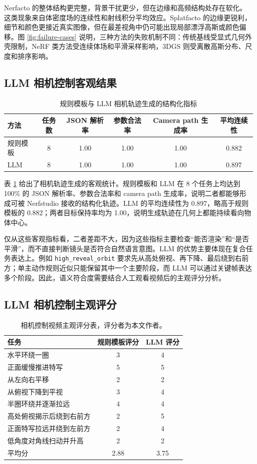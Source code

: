 \documentclass[a4paper, 12pt, centering]{article}
\begin{document}
Nerfacto 的整体结构更完整，背景干扰更少，但在边缘和高频结构处存在软化。这类现象来自体密度场的连续性和射线积分平均效应。Splatfacto 的边缘更锐利，细节和颜色更接近真实图像，但在最差视角中仍可能出现局部漂浮高斯或颜色偏移。图 \ref{fig:failure-cases} 说明，三种方法的失败机制不同：传统基线受显式几何外壳限制，NeRF 类方法受连续体场和平滑采样影响，3DGS 则受离散高斯分布、尺度和排序影响。

\subsection{LLM 相机控制客观结果}
\begin{table}[htbp]
\centering
\caption{规则模板与 LLM 相机轨迹生成的结构化指标}
\label{tab:camera-objective}
\begin{tabular}{lccccc}
\hline
方法 & 任务数 & JSON 解析率 & 参数合法率 & Camera path 生成率 & 平均连续性 \\
\hline
规则模板 & 8 & 1.00 & 1.00 & 1.00 & 0.882 \\
LLM & 8 & 1.00 & 1.00 & 1.00 & 0.897 \\
\hline
\end{tabular}
\end{table}

表 \ref{tab:camera-objective} 给出了相机轨迹生成的客观统计。规则模板和 LLM 在 8 个任务上均达到 100\% 的 JSON 解析率、参数合法率和 camera path 生成率，说明二者都能够形成可被 Nerfstudio 接收的结构化轨迹。LLM 的平均连续性为 0.897，略高于规则模板的 0.882；两者目标保持率均为 1.00，说明生成轨迹在几何上都能持续看向物体中心。

仅从这些客观指标看，二者差距不大，因为这些指标主要检查“能否渲染”和“是否平滑”，而不直接判断镜头是否符合自然语言意图。LLM 的优势主要体现在复合任务表达上。例如 \texttt{high\_reveal\_orbit} 要求先从高处俯视、再下降、最后绕到右前方；单主动作规则近似只能保留其中一个主要阶段，而 LLM 可以通过关键帧表达多个阶段。因此，语义符合度需要结合人工观看视频后的主观评分分析。

\subsection{LLM 相机控制主观评分}
\begin{table}[htbp]
\centering
\caption{相机控制视频主观评分表，评分者为本文作者。}
\label{tab:camera-subjective}
\begin{tabular}{p{}cc}
\hline
任务 & 规则模板评分 & LLM 评分 \\
\hline
水平环绕一圈 & 3 & 4 \\
正面缓慢推进特写 & 5 & 5 \\
从左向右平移 & 2 & 2 \\
从俯视下降到平视 & 3 & 4 \\
半圈环绕并逐渐拉远 & 4 & 4 \\
高处俯视揭示后绕到右前方 & 2 & 5 \\
正面特写拉远并绕到左前方 & 2 & 4 \\
低角度对角线扫动并升高 & 2 & 2 \\
\hline
平均分 & 2.88 & 3.75 \\
\hline
\end{tabular}
\end{table}
\end{document}
